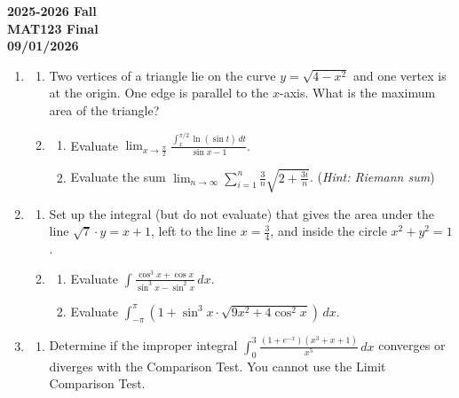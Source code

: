 \documentclass[a4paper, 12pt]{article}
\begin{document}
\newpage
{}
{}
\begin{center}
\textbf{2025-2026 Fall \\MAT123 Final\\09/01/2026}
\end{center}

\begin{enumerate}[leftmargin=*,label=\textbf{\arabic*.}]

\item \begin{enumerate}[leftmargin=*,label=\textbf{\alph*.}]
\item Two vertices of a triangle lie on the curve $y=\sqrt{4-x^2}$ and one vertex is at the origin. One edge is parallel to the $x$-axis. What is the maximum area of the triangle?

\item \begin{enumerate}[leftmargin=*,label=\textbf{\roman*.}]
\item Evaluate $\displaystyle\lim_{x\to\frac{\pi}2}\frac{\displaystyle\int_x^{\pi/2}\ln(\sin t)\,dt}{\sin x-1}$.
\item Evaluate the sum $\displaystyle\lim_{n\to\infty}\sum_{i=1}^n\frac3n\sqrt{2+\frac{3i}{n}}$. (\textit{Hint: Riemann sum})
\end{enumerate}
\end{enumerate}

\item \begin{enumerate}[leftmargin=*,label=\textbf{\alph*.}]

\item Set up the integral (but do not evaluate) that gives the area under the line $\sqrt7\cdot y=x+1$, left to the line $x=\frac34$, and inside the circle $x^2+y^2=1$.

\item \begin{enumerate}[leftmargin=*,label=\textbf{\roman*.}]
\item Evaluate $\displaystyle\int\frac{\cos^3x+\cos x}{\sin^3x-\sin^2x}\,dx$.
\item Evaluate $\displaystyle\int_{-\pi}^{\pi}\left(1+\sin^3x\cdot\sqrt{9x^2+4\cos^2x}\right)\,dx$.
\end{enumerate}
\end{enumerate}

\item \begin{enumerate}[leftmargin=*,label=\textbf{\alph*.}]
\item Determine if the improper integral $\displaystyle\int_0^3\frac{(1+e^{-x})(x^3+x+1)}{x^5}\,dx$ converges or diverges with the Comparison Test. You cannot use the Limit Comparison Test.


\end{enumerate}
\end{enumerate}
\end{document}
